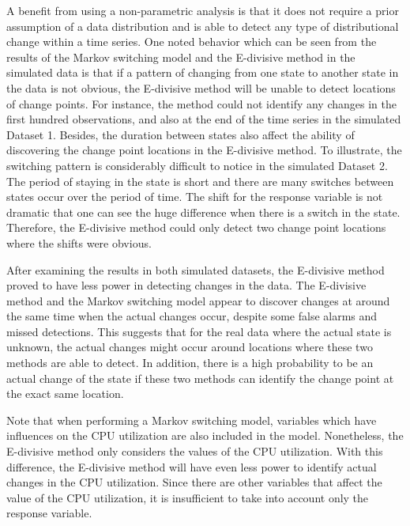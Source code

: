 A benefit from using a non-parametric analysis is that it does not
require a prior assumption of a data distribution and is able to detect
any type of distributional change within a time series. One noted
behavior which can be seen from the results of the Markov switching
model and the E-divisive method in the simulated data is that if a
pattern of changing from one state to another state in the data is
not obvious, the E-divisive method will be unable to detect locations
of change points. For instance, the method could not identify any
changes in the first hundred observations, and also at the end of
the time series in the simulated Dataset 1. Besides, the duration
between states also affect the ability of discovering the change point
locations in the E-divisive method. To illustrate, the switching pattern
is considerably difficult to notice in the simulated Dataset 2. The
period of staying in the state is short and there are many switches
between states occur over the period of time. The shift for the response
variable is not dramatic that one can see the huge difference when
there is a switch in the state. Therefore, the E-divisive method could
only detect two change point locations where the shifts were obvious. 

After examining the results in both simulated datasets, the E-divisive
method proved to have less power in detecting changes in the data.
The E-divisive method and the Markov switching model appear to discover
changes at around the same time when the actual changes occur, despite
some false alarms and missed detections. This suggests that for the
real data where the actual state is unknown, the actual changes might
occur around locations where these two methods are able to detect.
In addition, there is a high probability to be an actual change of
the state if these two methods can identify the change point at the
exact same location.

Note that when performing a Markov switching model, variables which
have influences on the CPU utilization are also included in the model.
Nonetheless, the E-divisive method only considers the values of the
CPU utilization. With this difference, the E-divisive method will
have even less power to identify actual changes in the CPU utilization.
Since there are other variables that affect the value of the CPU utilization,
it is insufficient to take into account only the response variable.
\begin{comment}
The E-divisive method appears to perform reasonably well in detecting
changes as far as a non-parametric analysis could. As can be seen
from \ref{subsec:Real-data}, the method is able to detect when a
change is happened around the same time as the Markov switching model
did. Even though the E-divisive method might not provide the best
result, it can give a general idea of estimated change points.
\end{comment}

